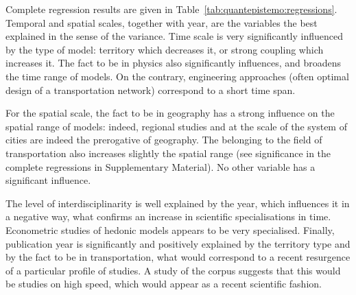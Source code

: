\documentclass[10pt]{article}
\begin{document}
Complete regression results are given in Table~\ref{tab:quantepistemo:regressions}. Temporal and spatial scales, together with year, are the variables the best explained in the sense of the variance. Time scale is very significantly influenced by the type of model: territory which decreases it, or strong coupling which increases it. The fact to be in physics also significantly influences, and broadens the time range of models. On the contrary, engineering approaches (often optimal design of a transportation network) correspond to a short time span.


For the spatial scale, the fact to be in geography has a strong influence on the spatial range of models: indeed, regional studies and at the scale of the system of cities are indeed the prerogative of geography. The belonging to the field of transportation also increases slightly the spatial range (see significance in the complete regressions in Supplementary Material). No other variable has a significant influence.

The level of interdisciplinarity is well explained by the year, which influences it in a negative way, what confirms an increase in scientific specialisations in time. Econometric studies of hedonic models appears to be very specialised. Finally, publication year is significantly and positively explained by the territory type and by the fact to be in transportation, what would correspond to a recent resurgence of a particular profile of studies. A study of the corpus suggests that this would be studies on high speed, which would appear as a recent scientific fashion.
\end{document}
